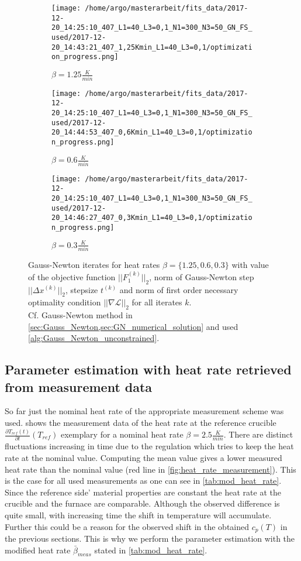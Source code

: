 \documentclass{scrartcl}[12pt, halfparskip]
\numberwithin{equation}{section}
\numberwithin{figure}{section}
\numberwithin{table}{section}
\begin{document}
\begin{figure}[H]
	\begin{subfigure}{0.49\textwidth}
		\texttt{[image: /home/argo/masterarbeit/fits\_data/2017-12-20\_14:25:10\_407\_L1=40\_L3=0,1\_N1=300\_N3=50\_GN\_FS\_used/2017-12-20\_14:43:21\_407\_1,25Kmin\_L1=40\_L3=0,1/optimization\_progress.png]}
		\caption{$\beta = 1.25 \frac{K}{min}$}
	\end{subfigure}
	\begin{subfigure}{0.49\textwidth}
		\texttt{[image: /home/argo/masterarbeit/fits\_data/2017-12-20\_14:25:10\_407\_L1=40\_L3=0,1\_N1=300\_N3=50\_GN\_FS\_used/2017-12-20\_14:44:53\_407\_0,6Kmin\_L1=40\_L3=0,1/optimization\_progress.png]}
		\caption{$\beta = 0.6 \frac{K}{min}$}
	\end{subfigure}
	\centering
	\begin{subfigure}{0.49\textwidth}
		\texttt{[image: /home/argo/masterarbeit/fits\_data/2017-12-20\_14:25:10\_407\_L1=40\_L3=0,1\_N1=300\_N3=50\_GN\_FS\_used/2017-12-20\_14:46:27\_407\_0,3Kmin\_L1=40\_L3=0,1/optimization\_progress.png]}
		\caption{$\beta = 0.3 \frac{K}{min}$}
	\end{subfigure}

	\caption{Gauss-Newton iterates for heat rates $\beta = \{ 1.25, 0.6, 0.3 \}$ with value of the objective function $||F_1^{(k)}||_2$, norm of Gauss-Newton step $||\Delta x^{(k)}||_2$, stepsize $t^{(k)}$ and norm of first order necessary optimality condition $|| \nabla \mathcal{L} ||_2$ for all iterates $k$.  \\
	Cf. Gauss-Newton method in \cref{sec:Gauss_Newton,sec:GN_numerical_solution} and used \cref{alg:Gauss_Newton_unconstrained}.}
	\label{fig:optimization_progress_FS_2}
\end{figure}



\subsection{Parameter estimation with heat rate retrieved from measurement data}
\label{sec:param_estimation_mod_heat_rate_FS}
So far just the nominal heat rate of the appropriate measurement scheme was used. 
 shows the measurement data of the heat rate at the reference crucible $\frac{\partial T_{ref}(t)}{\partial t}(T_{ref})$ exemplary for a nominal heat rate $\beta = 2.5 \frac{K}{min}$. 
There are distinct fluctuations increasing in time due to the regulation which tries to keep the heat rate at the nominal value. 
Computing the mean value gives a lower measured heat rate than the nominal value (red line in \cref{fig:heat_rate_measurement}). 
This is the case for all used measurements as one can see in \cref{tab:mod_heat_rate}. 
Since the reference side' material properties are constant the heat rate at the crucible and the furnace are comparable.
Although the observed difference is quite small, with increasing time the shift in temperature will accumulate.
Further this could be a reason for the observed shift in the obtained $c_p(T)$ in the previous sections.
This is why we perform the parameter estimation with the modified heat rate $\bar{\beta}_{meas}$ stated in \cref{tab:mod_heat_rate}.
\end{document}
